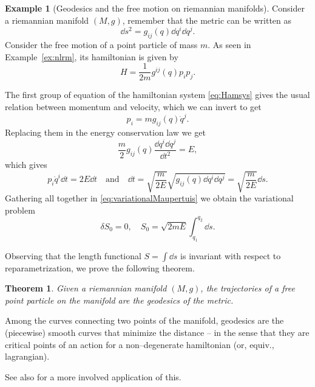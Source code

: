 \documentclass[english,fontsize=11pt,paper=b5]{scrbook}
\newtheorem{theorem}{Theorem}[chapter]
\theoremstyle{definition}
\newtheorem{example}{Example}[chapter]
\begin{document}
    \begin{example}[Geodesics and the free motion on riemannian manifolds]
      Consider a riemannian manifold $(M, g)$, remember that the metric  can be written as
      \begin{equation}
        \dd s^2 = g_{ij}(q)\dd q^i \dd q^j.
      \end{equation}
      Consider the free motion of a point particle of mass $m$. As seen in Example~\ref{ex:nlrm}, its hamiltonian is given by
      \begin{equation}
        H = \frac1{2m} g^{ij}(q) p_i p_j.
      \end{equation}

      The first group of equation of the hamiltonian system \eqref{eq:Hamsys} gives the usual relation between momentum and velocity, which we can invert to get
      \begin{equation}
        p_i = m g_{ij}(q)\dot q^j.
      \end{equation}
      Replacing them in the energy conservation law we get
      \begin{equation}
        \frac m2 g_{ij}(q)\frac{\dd q^i \dd q^j}{\dd t^2} = E,
      \end{equation}
      which gives
      \begin{equation}
        p_i\dot q^i \dd t= 2E \dd t
        \quad\mbox{and}\quad
        \dd t = \sqrt{\frac{m}{2E}}\sqrt{g_{ij}(q)\dd q^i \dd q^j} = \sqrt{\frac{m}{2E}} \dd s.
      \end{equation}
      Gathering all together in \eqref{eq:variationalMaupertuis} we obtain the variational problem
      \begin{equation}
        \delta S_0 = 0, \quad S_0 = \sqrt{2mE}\int_{q_1}^{q_2} \dd s.
      \end{equation}

      Observing that the length functional $S = \int \dd s$ is invariant with respect to reparametrization, we prove the following theorem.
      \begin{theorem}
        Given a riemannian manifold $(M,g)$, the trajectories of a free point particle on the manifold are the geodesics of the metric.
      \end{theorem}

      Among the curves connecting two points of the manifold, geodesics are the (piecewise) smooth curves that minimize the distance -- in the sense that they are critical points of an action for a non--degenerate hamiltonian (or, equiv., lagrangian).

      See also \cite{Bolsinov_1995} for a more involved application of this.
    \end{example}
\end{document}
